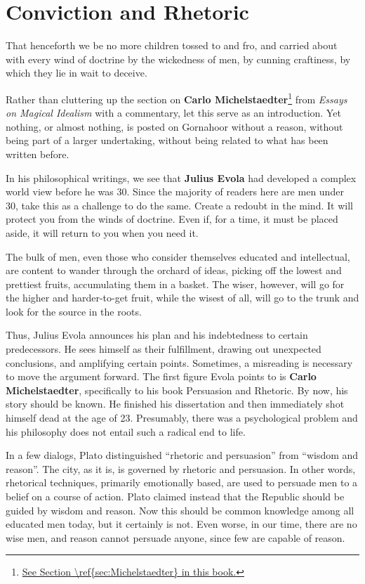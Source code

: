\section{Conviction and Rhetoric}

\begin{quotex}
That henceforth we be no more children tossed to and fro, and carried about with every wind of doctrine by the wickedness of men, by cunning craftiness, by which they lie in wait to deceive.
\end{quotex}

Rather than cluttering up the section on \textbf{Carlo Michelstaedter}\footnote{\url{See Section \ref{sec:Michelstaedter} in this book.}} from \textit{Essays on Magical Idealism} with a commentary, let this serve as an introduction. Yet nothing, or almost nothing, is posted on Gornahoor without a reason, without being part of a larger undertaking, without being related to what has been written before.

In his philosophical writings, we see that \textbf{Julius Evola} had developed a complex world view before he was 30. Since the majority of readers here are men under 30, take this as a challenge to do the same. Create a redoubt in the mind. It will protect you from the winds of doctrine. Even if, for a time, it must be placed aside, it will return to you when you need it.

The bulk of men, even those who consider themselves educated and intellectual, are content to wander through the orchard of ideas, picking off the lowest and prettiest fruits, accumulating them in a basket. The wiser, however, will go for the higher and harder-to-get fruit, while the wisest of all, will go to the trunk and look for the source in the roots.

Thus, Julius Evola announces his plan and his indebtedness to certain predecessors. He sees himself as their fulfillment, drawing out unexpected conclusions, and amplifying certain points. Sometimes, a misreading is necessary to move the argument forward. The first figure Evola points to is \textbf{Carlo Michelstaedter}, specifically to his book Persuasion and Rhetoric. By now, his story should be known. He finished his dissertation and then immediately shot himself dead at the age of 23. Presumably, there was a psychological problem and his philosophy does not entail such a radical end to life.

In a few dialogs, Plato distinguished ``rhetoric and persuasion'' from ``wisdom and reason''. The city, as it is, is governed by rhetoric and persuasion. In other words, rhetorical techniques, primarily emotionally based, are used to persuade men to a belief on a course of action. Plato claimed instead that the Republic should be guided by wisdom and reason. Now this should be common knowledge among all educated men today, but it certainly is not. Even worse, in our time, there are no wise men, and reason cannot persuade anyone, since few are capable of reason.

